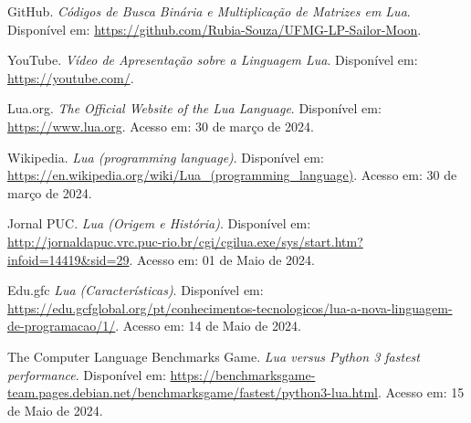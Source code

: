\documentclass[12pt]{article}
\begin{document}
\begin{thebibliography}{9}

 GitHub. \textit{Códigos de Busca Binária e Multiplicação de Matrizes em Lua}. Disponível em: \url{https://github.com/Rubia-Souza/UFMG-LP-Sailor-Moon}.

 YouTube. \textit{Vídeo de Apresentação sobre a Linguagem Lua}. Disponível em: \url{https://youtube.com/}.

 Lua.org. \textit{The Official Website of the Lua Language}. Disponível em: \url{https://www.lua.org}. Acesso em: 30 de março de 2024.

 Wikipedia. \textit{Lua (programming language)}. Disponível em: \url{https://en.wikipedia.org/wiki/Lua\_(programming\_language)}. Acesso em: 30 de março de 2024.

 Jornal PUC. \textit{Lua (Origem e História)}. Disponível em: \url{http://jornaldapuc.vrc.puc-rio.br/cgi/cgilua.exe/sys/start.htm?infoid=14419&sid=29}. Acesso em: 01 de Maio de 2024.

 Edu.gfc \textit{Lua (Características)}. Disponível em: \url{https://edu.gcfglobal.org/pt/conhecimentos-tecnologicos/lua-a-nova-linguagem-de-programacao/1/}. Acesso em: 14 de Maio de 2024.

 The Computer Language Benchmarks Game. \textit{Lua versus Python 3 fastest performance}. Disponível em: \url{https://benchmarksgame-team.pages.debian.net/benchmarksgame/fastest/python3-lua.html}. Acesso em: 15 de Maio de 2024.


\end{thebibliography}
\end{document}
